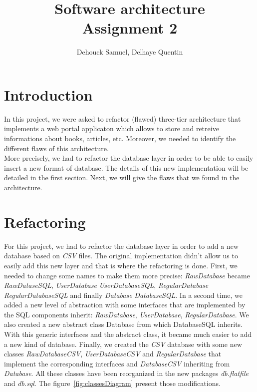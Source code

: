 \documentclass[a4paper,10pt]{article}
\title{Software architecture \\ Assignment 2}
\author{ Dehouck Samuel, Delhaye Quentin \\}
\begin{document}
\maketitle

\section{Introduction}

In this project, we were asked to refactor (flawed) three-tier architecture that implements a web portal applicaton which allows to store and retreive informations about books, articles, etc. Moreover, we needed to identify the different flaws of
this architecture.\\
More precisely, we had to refactor the database layer in order to be able to easily insert a new format of database. The details of this new implementation will be detailed in the first section. Next, we will give the flaws that we found in the architecture.

\section{Refactoring}

For this project, we had to refactor the database layer in order to add a new database based on \textit{CSV} files. The original implementation didn't allow us to easily add this new layer and that is where the refactoring is done.
\newline
First, we needed to change some names to make them more precise: \textit{RawDatabase} became \textit{RawDataseSQL}, \textit{UserDatabase} \textit{UserDatabaseSQL}, \textit{RegularDatabase} \textit{RegularDatabaseSQL} and finally \textit{Database} \textit{DatabaseSQL}. 
\newline
In a second time, we added a new level of abstraction with some interfaces that are implemented by the SQL components inherit: \textit{RawDatabase}, \textit{UserDatabase}, \textit{RegularDatabase}.  We also created a new abstract 
class Database from which DatabaseSQL inherits. With this generic interfaces and the abstract class, it became much easier to add a new kind of database.
\newline
Finally, we created the \textit{CSV} database with some new classes \textit{RawDatabaseCSV}, \textit{UserDatabaseCSV} and \textit{RegularDatabase} that implement the corresponding interfaces and \textit{DatabaseCSV} inheriting from \textit{Database}.
\newline
All these classes have been reorganized in the new packages \textit{db.flatfile} and \textit{db.sql}.
\newline
The figure~\ref{fig:classesDiagram} present those modifications.
\end{document}
